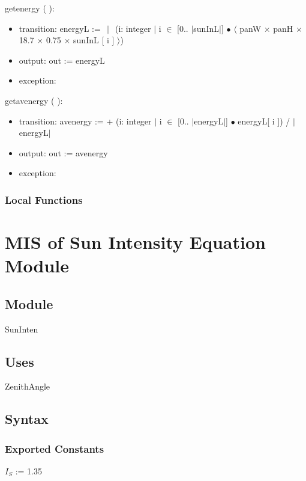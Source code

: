 \documentclass[12pt, titlepage]{article}
\begin{document}
\noindent  getenergy ( ):
\begin{itemize}
\item transition: energyL :=  $\|$ (i: integer $|$ i $\in$ [0.. $|$sunInL$|$] $\bullet$ $\langle$ panW $\times$ panH $\times$ 18.7 $\times$ 0.75 $\times$ sunInL [ i ] $\rangle$)
\item output: out := energyL
\item exception: 
\end{itemize}

\noindent  getavenergy ( ):
\begin{itemize}
\item transition: avenergy :=  + (i: integer $|$ i $\in$ [0.. $|$energyL$|$] $\bullet$  energyL[ i ]) / $|$energyL$|$
\item output: out := avenergy
\item exception: 
\end{itemize}


\subsubsection{Local Functions}


\section{MIS of Sun Intensity Equation Module} \label{ModuleSI} 



\subsection{Module}
SunInten

\subsection{Uses}
ZenithAngle

\subsection{Syntax}

\subsubsection{Exported Constants}
$I_{S}$ := 1.35\\
\end{document}
